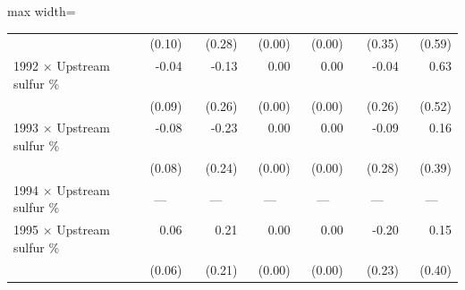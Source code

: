\begin{table}[htbp]
{\begin{adjustbox}{max width=\linewidth}
\begin{tabular}{lrrrrrr}
 & (\phantom{-}0.10)\phantom{$^{***}$} & (\phantom{-}0.28)\phantom{$^{***}$} & (\phantom{-}0.00)\phantom{$^{***}$} & (\phantom{-}0.00)\phantom{$^{***}$} & (\phantom{-}0.35)\phantom{$^{***}$} & (\phantom{-}0.59)\phantom{$^{***}$} \\
1992 $\times$ Upstream sulfur \% & \phantom{(}-0.04$^{\phantom{*}\phantom{*}\phantom{*}}$ & \phantom{(}-0.13$^{\phantom{*}\phantom{*}\phantom{*}}$ & \phantom{(}\phantom{-}0.00$^{\phantom{*}\phantom{*}\phantom{*}}$ & \phantom{(}\phantom{-}0.00$^{\phantom{*}\phantom{*}\phantom{*}}$ & \phantom{(}-0.04$^{\phantom{*}\phantom{*}\phantom{*}}$ & \phantom{(}\phantom{-}0.63$^{\phantom{*}\phantom{*}\phantom{*}}$ \\
 & (\phantom{-}0.09)\phantom{$^{***}$} & (\phantom{-}0.26)\phantom{$^{***}$} & (\phantom{-}0.00)\phantom{$^{***}$} & (\phantom{-}0.00)\phantom{$^{***}$} & (\phantom{-}0.26)\phantom{$^{***}$} & (\phantom{-}0.52)\phantom{$^{***}$} \\
1993 $\times$ Upstream sulfur \% & \phantom{(}-0.08$^{\phantom{*}\phantom{*}\phantom{*}}$ & \phantom{(}-0.23$^{\phantom{*}\phantom{*}\phantom{*}}$ & \phantom{(}\phantom{-}0.00$^{\phantom{*}\phantom{*}\phantom{*}}$ & \phantom{(}\phantom{-}0.00$^{\phantom{*}\phantom{*}\phantom{*}}$ & \phantom{(}-0.09$^{\phantom{*}\phantom{*}\phantom{*}}$ & \phantom{(}\phantom{-}0.16$^{\phantom{*}\phantom{*}\phantom{*}}$ \\
 & (\phantom{-}0.08)\phantom{$^{***}$} & (\phantom{-}0.24)\phantom{$^{***}$} & (\phantom{-}0.00)\phantom{$^{***}$} & (\phantom{-}0.00)\phantom{$^{***}$} & (\phantom{-}0.28)\phantom{$^{***}$} & (\phantom{-}0.39)\phantom{$^{***}$} \\
1994 $\times$ Upstream sulfur \% & \multicolumn{1}{c}{---} & \multicolumn{1}{c}{---} & \multicolumn{1}{c}{---} & \multicolumn{1}{c}{---} & \multicolumn{1}{c}{---} & \multicolumn{1}{c}{---} \\
1995 $\times$ Upstream sulfur \% & \phantom{(}\phantom{-}0.06$^{\phantom{*}\phantom{*}\phantom{*}}$ & \phantom{(}\phantom{-}0.21$^{\phantom{*}\phantom{*}\phantom{*}}$ & \phantom{(}\phantom{-}0.00$^{\phantom{*}\phantom{*}\phantom{*}}$ & \phantom{(}\phantom{-}0.00$^{\phantom{*}\phantom{*}\phantom{*}}$ & \phantom{(}-0.20$^{\phantom{*}\phantom{*}\phantom{*}}$ & \phantom{(}\phantom{-}0.15$^{\phantom{*}\phantom{*}\phantom{*}}$ \\
 & (\phantom{-}0.06)\phantom{$^{***}$} & (\phantom{-}0.21)\phantom{$^{***}$} & (\phantom{-}0.00)\phantom{$^{***}$} & (\phantom{-}0.00)\phantom{$^{***}$} & (\phantom{-}0.23)\phantom{$^{***}$} & (\phantom{-}0.40)\phantom{$^{***}$} \\

\end{tabular}
\end{adjustbox}}
\end{table}
